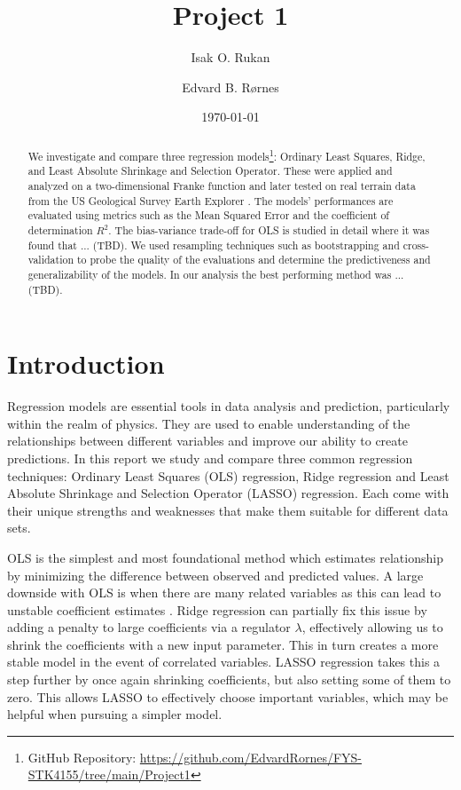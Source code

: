 \documentclass[%
reprint,
amsmath,amssymb,
aps,
pra,
]{revtex4-2}
\begin{document}
	
\title{Project 1}
\author{Isak O. Rukan}
\author{Edvard B. Rørnes}
\date{\today}

\begin{abstract}
	We investigate and compare three regression models\footnote{GitHub Repository: \url{https://github.com/EdvardRornes/FYS-STK4155/tree/main/Project1}}: Ordinary Least Squares, Ridge, and Least Absolute Shrinkage and Selection Operator. These were applied and analyzed on a two-dimensional Franke function and later tested on real terrain data from the US Geological Survey Earth Explorer \cite{USGS_EarthExplorer}. The models' performances are evaluated using metrics such as the Mean Squared Error and the coefficient of determination $R^2$. The bias-variance trade-off for OLS is studied in detail where it was found that ... (TBD). We used resampling techniques such as bootstrapping and cross-validation to probe the quality of the evaluations and determine the predictiveness and generalizability of the models. In our analysis the best performing method was ... (TBD).
\end{abstract}

\maketitle

\section{Introduction}
Regression models are essential tools in data analysis and prediction, particularly within the realm of physics. They are used to enable understanding of the relationships between different variables and improve our ability to create predictions. In this report we study and compare three common regression techniques: Ordinary Least Squares (OLS) regression, Ridge regression and Least Absolute Shrinkage and Selection Operator (LASSO) regression. Each come with their unique strengths and weaknesses that make them suitable for different data sets. 

OLS is the simplest and most foundational method which estimates relationship by minimizing the difference between observed and predicted values. A large downside with OLS is when there are many related variables as this can lead to unstable coefficient estimates \cite{Bishop2006}. Ridge regression can partially fix this issue by adding a penalty to large coefficients via a regulator $\lambda$, effectively allowing us to shrink the coefficients with a new input parameter. This in turn creates a more stable model in the event of correlated variables. LASSO regression takes this a step further by once again shrinking coefficients, but also setting some of them to zero. This allows LASSO to effectively choose important variables, which may be helpful when pursuing a simpler model.
\end{document}
